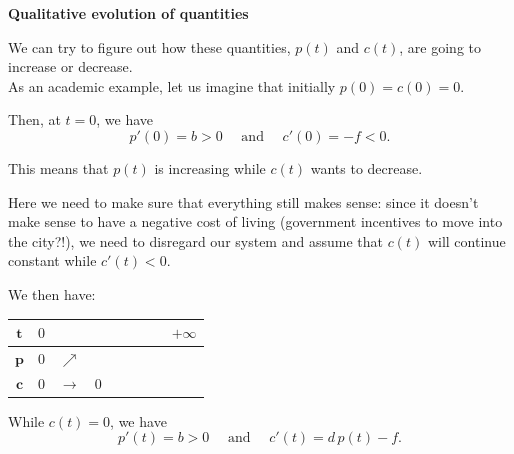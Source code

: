 \hfill

\begin{center}
\textbf{\color{cyan}
Qualitative evolution of quantities
}
\end{center}


We can try to figure out how these quantities, $p(t)$ and $c(t)$, are going to increase or decrease. \\

As an academic example, let us imagine that initially  \quad $p(0)=c(0)=0$.

Then, at $t=0$, we have
$$
p'(0)= b > 0 \quad \text{ and } \quad
c'(0)=-f < 0.
$$

This means that $p(t)$ is increasing while $c(t)$ wants to decrease.

Here we need to make sure that everything still makes sense: since it doesn't make sense to have a negative cost of living (government incentives to move into the city?!), we need to disregard our system and assume that $c(t)$ will continue constant while $c'(t)<0$.

We then have:
\begin{graybox}
\begin{center}
\begin{tabular}{c||c|c|c|c|c|c|c|c}
$\pmb{t}$	& $0$ 		& 			& &  			& 			& 	&	& \hspace{1cm} $+\infty$ \\[5pt] \hline\hline
$\pmb{p}$ & $0$	& $\nearrow$	& \hspace{0.5cm} &	\hspace{1cm}	&	&  \hspace{0.5cm}	&  	& 	\\[5pt] \hline
$\pmb{c}$ & $0$		& $\rightarrow$	&  0 & \hspace{1cm} & 	\hspace{0.5cm}	& \hspace{1cm} 	& \hspace{0.5cm}	&\hspace{1cm}	\\[5pt]
\end{tabular}
\end{center}
\end{graybox}

While $c(t)=0$, we have
$$
p'(t)= b > 0  \quad \text{ and } \quad 
c'(t)=d\, p(t) -f.
$$

